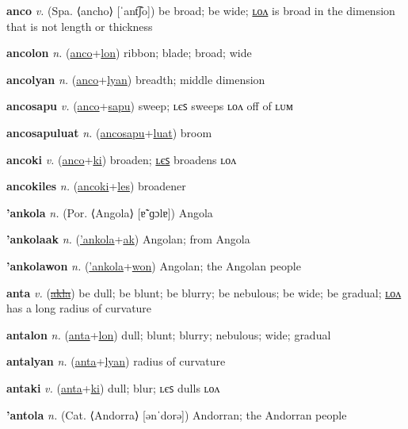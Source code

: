 \textbf{\hypertarget{anco}{anco}} \textit{v.} (Spa. ⟨ancho⟩ [ˈant͡ʃo])
be broad; be wide; \hyperlink{ancolon}{ʟᴏᴧ} is broad in the dimension that is not length or thickness

\textbf{\hypertarget{ancolon}{ancolon}} \textit{n.} (\hyperlink{anco}{anco}+\allowbreak \hyperlink{lon}{lon})
ribbon; blade; broad; wide

\textbf{\hypertarget{ancolyan}{ancolyan}} \textit{n.} (\hyperlink{anco}{anco}+\allowbreak \hyperlink{lyan}{lyan})
breadth; middle dimension

\textbf{\hypertarget{ancosapu}{ancosapu}} \textit{v.} (\hyperlink{anco}{anco}+\allowbreak \hyperlink{sapu}{sapu})
sweep; ʟєꜱ sweeps ʟᴏᴧ off of ʟᴜᴍ

\textbf{\hypertarget{ancosapuluat}{ancosapuluat}} \textit{n.} (\hyperlink{ancosapu}{ancosapu}+\allowbreak \hyperlink{luat}{luat})
broom

\textbf{\hypertarget{ancoki}{ancoki}} \textit{v.} (\hyperlink{anco}{anco}+\allowbreak \hyperlink{ki}{ki})
broaden; \hyperlink{ancokiles}{ʟєꜱ} broadens ʟᴏᴧ

\textbf{\hypertarget{ancokiles}{ancokiles}} \textit{n.} (\hyperlink{ancoki}{ancoki}+\allowbreak \hyperlink{les}{les})
broadener

\textbf{\hypertarget{'ankola}{'ankola}} \textit{n.} (Por. ⟨Angola⟩ [ɐ̃ˈɡɔlɐ])
Angola

\textbf{\hypertarget{'ankolaak}{'ankolaak}} \textit{n.} (\hyperlink{'ankola}{'ankola}+\allowbreak \hyperlink{ak}{ak})
Angolan; from Angola

\textbf{\hypertarget{'ankolawon}{'ankolawon}} \textit{n.} (\hyperlink{'ankola}{'ankola}+\allowbreak \hyperlink{won}{won})
Angolan; the Angolan people

\textbf{\hypertarget{anta}{anta}} \textit{v.} (\hyperlink{akla}{\sout{akla}})
be dull; be blunt; be blurry; be nebulous; be wide; be gradual; \hyperlink{antalon}{ʟᴏᴧ} has a long radius of curvature

\textbf{\hypertarget{antalon}{antalon}} \textit{n.} (\hyperlink{anta}{anta}+\allowbreak \hyperlink{lon}{lon})
dull; blunt; blurry; nebulous; wide; gradual

\textbf{\hypertarget{antalyan}{antalyan}} \textit{n.} (\hyperlink{anta}{anta}+\allowbreak \hyperlink{lyan}{lyan})
radius of curvature

\textbf{\hypertarget{antaki}{antaki}} \textit{v.} (\hyperlink{anta}{anta}+\allowbreak \hyperlink{ki}{ki})
dull; blur; ʟєꜱ dulls ʟᴏᴧ

\textbf{\hypertarget{'antola}{'antola}} \textit{n.} (Cat. ⟨Andorra⟩ [ənˈdorə])
Andorran; the Andorran people


